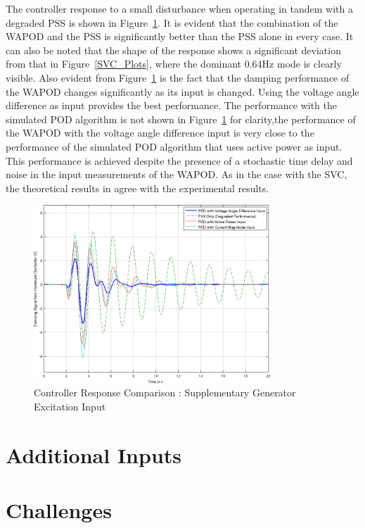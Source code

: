 \documentclass[journal]{IEEEtran}
\begin{document}
The controller response to a small disturbance when operating in tandem with a degraded PSS is shown in Figure~\ref{Generator_Plots}. It is evident that the combination of the WAPOD and the PSS is significantly better than the PSS alone in every case. It can also be noted that the shape of the response shows a significant deviation from that in Figure~\ref{SVC_Plots}, where the dominant 0.64Hz mode is clearly visible. Also evident from Figure~\ref{Generator_Plots} is the fact that the damping performance of the WAPOD changes significantly as its input is changed. Using the voltage angle difference as input provides the best performance. The performance with the simulated POD algorithm is not shown in Figure~\ref{Generator_Plots} for clarity,the performance of the WAPOD with the voltage angle difference input is very close to the performance of the simulated POD algorithm that uses active power as input. This performance is achieved despite the presence of a stochastic time delay and noise in the input measurements of the WAPOD. As in the case with the SVC, the theoretical results in \cite{Yuwa} agree with the experimental results.

\begin{figure}[!th]
\centering
\includegraphics[width=3.5in]{Wide_Area_ResponseComparison_SamePlot.png}
\caption{Controller Response Comparison : Supplementary Generator Excitation Input}
\label{Generator_Plots}
\end{figure}

\section{Additional Inputs}

\section{Challenges}\label{Challenges}
\end{document}
